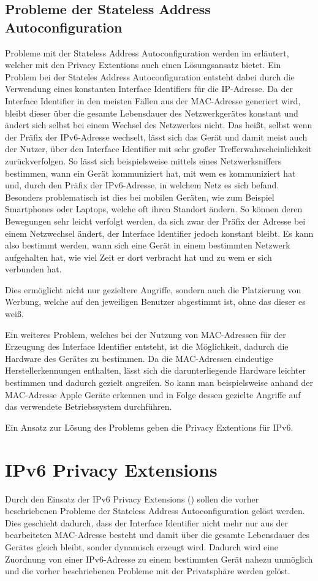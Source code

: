 \documentclass[a4paper, 12pt]{scrartcl}
\begin{document}
\subsection{Probleme der Stateless Address Autoconfiguration}
Probleme mit der Stateless Address Autoconfiguration werden im \cite{rfc4941} erläutert, welcher mit den Privacy Extentions auch einen Lösungsansatz bietet.
Ein Problem bei der Stateles Address Autoconfiguration entsteht dabei durch die Verwendung eines konstanten Interface Identifiers für die IP-Adresse. 
Da der Interface Identifier in den meisten Fällen aus der MAC-Adresse generiert wird, bleibt dieser über die gesamte Lebensdauer des Netzwerkgerätes konstant und ändert sich selbst bei einem Wechsel des Netzwerkes nicht. 
Das heißt, selbst wenn der Präfix der IPv6-Adresse wechselt, lässt sich das Gerät und damit meist auch der Nutzer, über den Interface Identifier mit sehr großer Trefferwahrscheinlichkeit zurückverfolgen.
So lässt sich beispielsweise mittels eines Netzwerksniffers bestimmen, wann ein Gerät kommuniziert hat, mit wem es kommuniziert hat und, durch den Präfix der IPv6-Adresse, in welchem Netz es sich befand.
Besonders problematisch ist dies bei mobilen Geräten, wie zum Beispiel Smartphones oder Laptops, welche oft ihren Standort ändern.
So können deren Bewegungen sehr leicht verfolgt werden, da sich zwar der Präfix der Adresse bei einem Netzwechsel ändert, der Interface Identifier jedoch konstant bleibt. 
Es kann also bestimmt werden, wann sich eine Gerät in einem bestimmten Netzwerk aufgehalten hat, wie viel Zeit er dort verbracht hat und zu wem er sich verbunden hat.

Dies ermöglicht nicht nur gezieltere Angriffe, sondern auch die Platzierung von Werbung, welche auf den jeweiligen Benutzer abgestimmt ist, ohne das dieser es weiß.

Ein weiteres Problem, welches bei der Nutzung von MAC-Adressen für der Erzeugung des Interface Identifier entsteht, ist die Möglichkeit, dadurch die Hardware des Gerätes zu bestimmen. Da die MAC-Adressen eindeutige Herstellerkennungen enthalten, lässt sich die darunterliegende Hardware leichter bestimmen und dadurch gezielt angreifen. So kann man beispielsweise anhand der MAC-Adresse Apple Geräte erkennen und in Folge dessen gezielte Angriffe auf das verwendete Betriebssystem durchführen.

Ein Ansatz zur Lösung des Problems geben die Privacy Extentions für IPv6.


\section{IPv6 Privacy Extensions}
Durch den Einsatz der IPv6 Privacy Extensions (\cite{rfc4941}) sollen die vorher beschriebenen Probleme der Stateless Address Autoconfiguration gelöst werden.
Dies geschieht dadurch, dass der Interface Identifier nicht mehr nur aus der bearbeiteten MAC-Adresse besteht und damit über die gesamte Lebensdauer des Gerätes gleich bleibt, sonder dynamisch erzeugt wird.
Dadurch wird eine Zuordnung von einer IPv6-Adresse zu einem bestimmten Gerät nahezu unmöglich und die vorher beschriebenen Probleme mit der Privatsphäre werden gelöst.
\end{document}
